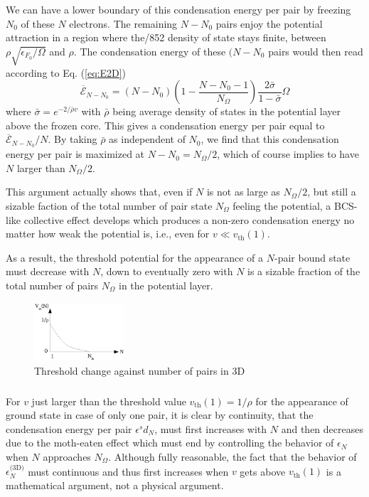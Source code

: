 \documentclass{article}
\newcommand{\sd}{{\ensuremath{{\text{(3D)}}}}}
\begin{document}
We can have a lower boundary of this condensation energy per pair by freezing $N_0$ of these $N$ electrons.  The remaining $N-N_0$ pairs enjoy the potential attraction in a region where the/852 density of state stays finite, between $\rho\sqrt{\epsilon_{F_0}/\Omega}$ and $\rho$.  The condensation energy of these $(N-N_0$ pairs would then read according to Eq. (\ref{eq:E2D})
\begin{equation}\label{eq:E2D}
 \overline{\mathcal{E}}_{N-N_0}=(N-N_0)(1-\frac{N-N_0-1}{N_\Omega})\frac{2\bar\sigma}{1-\bar\sigma}\Omega
\end{equation}
where $\bar{\sigma}=e^{-2/{\bar{\rho}v}}$ with $\bar\rho$ being average density of states in the potential layer above the frozen core. This gives a condensation energy per pair equal to $\overline{\mathcal{E}}_{N-N_0}/N$.  By taking $\bar\rho$ as independent of $N_0$, we find that this condensation energy per pair is maximized at $N-N_0=N_\Omega/2$, which of course implies to have $N$ larger than $N_\Omega/2$.

This argument actually shows that, even if $N$ is not as large as $N_\Omega/2$, but still a sizable faction of the total number of pair state $N_\Omega$ feeling the potential,  a BCS-like collective effect develops which produces a non-zero condensation energy no matter how weak the potential is, i.e., even for $v\ll{}v_\text{th}(1)$. 

As a result, the threshold potential for the appearance of a $N$-pair bound state must decrease with $N$, down to eventually zero with $N$ is a sizable fraction of the total number of pairs $N_\Omega$ in the potential layer. 

\begin{figure}[htb]
	\centering
		\includegraphics[width=0.30\textwidth]{3dThresholdChange.eps}
	\caption{Threshold change against number of pairs in 3D}
	\label{fig:3dThresholdChange}
\end{figure}

\subsubsection{}
For $v$ just larger than the threshold value $v_{\text{th}}(1)=1/\rho$ for the appearance of ground state in case of only one pair, it is clear by continuity, that the condensation energy per pair $\epsilon^sd_N$, must first increases with $N$ and then decreases due to the moth-eaten effect which must end by controlling the behavior of $\epsilon_N$ when $N$ approaches $N_\Omega$.  Although fully reasonable, the fact that the behavior of $\epsilon^\sd_N$ must continuous and thus first increases when $v$ gets above $v_{\text{th}}(1)$ is a mathematical argument, not a physical argument. 
\end{document}
